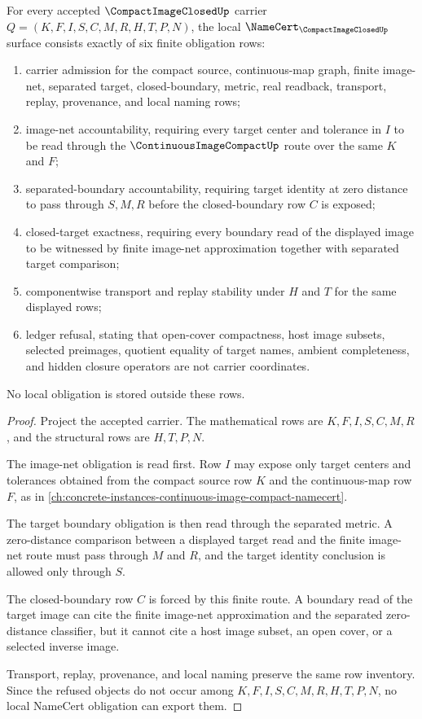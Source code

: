 \begin{theorem}
\label{thm:compact-image-closed-namecert-obligations}
For every accepted $\CompactImageClosedUp$ carrier $Q=(K,F,I,S,C,M,R,H,T,P,N)$, the local $\NameCert_{\CompactImageClosedUp}$ surface consists exactly of six finite obligation rows:
\begin{enumerate}
\item carrier admission for the compact source, continuous-map graph, finite image-net, separated target, closed-boundary, metric, real readback, transport, replay, provenance, and local naming rows;
\item image-net accountability, requiring every target center and tolerance in $I$ to be read through the $\ContinuousImageCompactUp$ route over the same $K$ and $F$;
\item separated-boundary accountability, requiring target identity at zero distance to pass through $S,M,R$ before the closed-boundary row $C$ is exposed;
\item closed-target exactness, requiring every boundary read of the displayed image to be witnessed by finite image-net approximation together with separated target comparison;
\item componentwise transport and replay stability under $H$ and $T$ for the same displayed rows;
\item ledger refusal, stating that open-cover compactness, host image subsets, selected preimages, quotient equality of target names, ambient completeness, and hidden closure operators are not carrier coordinates.
\end{enumerate}
No local obligation is stored outside these rows.
\end{theorem}
\begin{proof}
Project the accepted carrier. The mathematical rows are $K,F,I,S,C,M,R$, and the structural rows are $H,T,P,N$.

The image-net obligation is read first. Row $I$ may expose only target centers and tolerances obtained from the compact source row $K$ and the continuous-map row $F$, as in \autoref{ch:concrete-instances-continuous-image-compact-namecert}.

The target boundary obligation is then read through the separated metric. A zero-distance comparison between a displayed target read and the finite image-net route must pass through $M$ and $R$, and the target identity conclusion is allowed only through $S$.

The closed-boundary row $C$ is forced by this finite route. A boundary read of the target image can cite the finite image-net approximation and the separated zero-distance classifier, but it cannot cite a host image subset, an open cover, or a selected inverse image.

Transport, replay, provenance, and local naming preserve the same row inventory. Since the refused objects do not occur among $K,F,I,S,C,M,R,H,T,P,N$, no local NameCert obligation can export them.
\end{proof}


